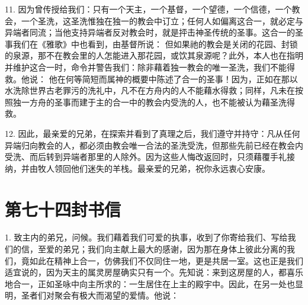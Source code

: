 11. 因为曾传授给我们：只有一个天主，一个基督，一个望德，一个信德，一个教会，一个圣洗，这圣洗惟独在独一的教会中订立；任何人如偏离这合一，就必定与异端者同流；当他支持异端者反对教会时，就是抨击神圣传统的圣事。这合一的圣事我们在《雅歌》中也看到，由基督所说：  但如果祂的教会是关闭的花园、封锁的泉源，那不在教会里的人怎能进入那花园，或饮其泉源呢？此外，本人也在指明并维护这合一时，命令并警告我们：除非藉着独一教会的唯一圣洗，我们不能得救。他说：  他在何等简短而属神的概要中陈述了合一的圣事！因为，正如在那以水洗除世界古老罪污的洗礼中，凡不在方舟内的人不能藉水得救；同样，凡未在按照独一方舟的圣事而建于主的合一中的教会内受洗的人，也不能被认为藉圣洗得救。\par

12. 因此，最亲爱的兄弟，在探索并看到了真理之后，我们遵守并持守：凡从任何异端归向教会的人，都必须由教会唯一合法的圣洗受洗，但那些先前已经在教会内受洗、而后转到异端者那里的人除外。因为这些人悔改返回时，只须藉覆手礼接纳，并由牧人领回他们迷失的羊栈。最亲爱的兄弟，祝你永远衷心安康。\par



\section{第七十四封书信}

\par

\par

1. 致主内的弟兄，问候。我们藉着我们可爱的执事，收到了你寄给我们、写给我们的信，至爱的弟兄；我们向主献上最大的感谢，因为那在身体上彼此分离的我们，竟如此在精神上合一，仿佛我们不仅同住一地，更是共居一室。这也正是我们适宜说的，因为天主的属灵房屋确实只有一个。先知说：来到这房屋的人，都喜乐地合一，正如圣咏中向主所求的：一生居住在上主的殿宇中。因此，在另一处也显明，圣者们对聚会有极大而渴望的爱情。他说：\par

